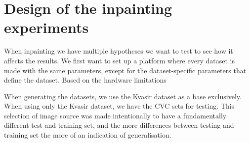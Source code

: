 \section{Design of the inpainting experiments}
When inpainting we have multiple hypotheses we want to test to see how it affects the results. We first want to set up a platform where every dataset is made with the same parameters, except for the dataset-specific parameters that define the dataset. Based on the hardware limitations 

When generating the datasets, we use the Kvasir dataset as a base exclusively. When using only the Kvasir dataset, we have the CVC sets for testing. This selection of image source was made intentionally to have a fundamentally different test and training set, and the more differences between testing and training set the more of an indication of generalisation. 

